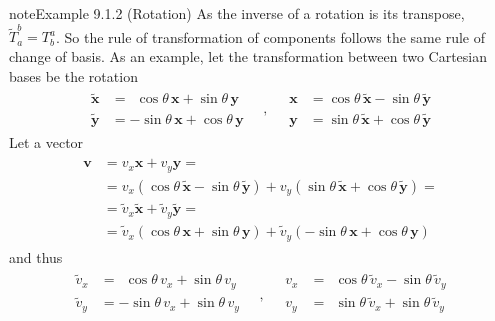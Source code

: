 \documentclass[letterpaper,10pt,english]{jupyterBook}
\begin{document}
\begin{sphinxadmonition}{note}{Example 9.1.2 (Rotation)}
\sphinxAtStartPar
As the inverse of a rotation is its transpose, \(\widetilde{T}^{b}_{a} = T^{a}_b\). So the rule of transformation of components follows the same rule of change of basis. As an example, let the transformation between two Cartesian bases be the rotation
\begin{equation*}
\begin{split}
\begin{aligned}
 \widetilde{\mathbf{x}} & = \ \ \cos \theta \, \mathbf{x} + \sin \theta \, \mathbf{y} \\
 \widetilde{\mathbf{y}} & =   - \sin \theta \, \mathbf{x} + \cos \theta \, \mathbf{y}
\end{aligned}
\quad , \quad 
\begin{aligned}
 \mathbf{x} & =     \cos \theta \, \widetilde{\mathbf{x}} - \sin \theta \, \widetilde{\mathbf{y}} \\
 \mathbf{y} & =     \sin \theta \, \widetilde{\mathbf{x}} + \cos \theta \, \widetilde{\mathbf{y}}
\end{aligned}
\end{split}
\end{equation*}
\sphinxAtStartPar
Let a vector
\begin{equation*}
\begin{split}\begin{aligned}
  \mathbf{v}
  & = v_x \mathbf{x} + v_y \mathbf{y} = \\
  & = v_x \left( \cos \theta \, \widetilde{\mathbf{x}} - \sin \theta \, \widetilde{\mathbf{y}} \right) + v_y \left( \sin \theta \, \widetilde{\mathbf{x}} + \cos \theta \, \widetilde{\mathbf{y}} \right) = \\
  & = \widetilde{v}_x \widetilde{\mathbf{x}} + \widetilde{v}_y \widetilde{\mathbf{y}} = \\
  & = \widetilde{v}_x \left( \cos \theta \, \mathbf{x} + \sin \theta \, \mathbf{y} \right) + \widetilde{v}_y \left( - \sin \theta \, \mathbf{x} + \cos \theta \, \mathbf{y} \right) 
\end{aligned}\end{split}
\end{equation*}
\sphinxAtStartPar
and thus
\begin{equation*}
\begin{split}
\begin{aligned}
  \widetilde{v}_x & = \ \ \cos \theta \, v_x + \sin \theta \, v_y \\
  \widetilde{v}_y & =   - \sin \theta \, v_x + \sin \theta \, v_y \\
\end{aligned}
\quad , \quad 
\begin{aligned}
  v_x & = \ \ \cos \theta \, \widetilde{v}_x - \sin \theta \, \widetilde{v}_y \\
  v_y & = \ \ \sin \theta \, \widetilde{v}_x + \sin \theta \, \widetilde{v}_y \\
\end{aligned}
\end{split}
\end{equation*}\end{sphinxadmonition}
\end{document}
